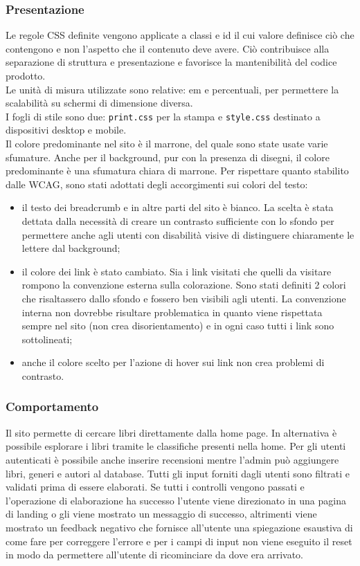\documentclass[12pt,a4paper,headings=optiontohead]{article}
\begin{document}
	\subsubsection{Presentazione}
	Le regole CSS definite vengono applicate a classi e id il cui valore definisce ciò che contengono e non l'aspetto che il contenuto deve avere. Ciò contribuisce alla separazione di struttura e presentazione e favorisce la mantenibilità del codice prodotto.\\
	Le unità di misura utilizzate sono relative: em e percentuali, per permettere la scalabilità su schermi di dimensione diversa. \\
	I fogli di stile sono due: \texttt{print.css} per la stampa e \texttt{style.css} destinato a dispositivi desktop e mobile. \\
	Il colore predominante nel sito è il marrone, del quale sono state usate varie sfumature. Anche per il background, pur con la presenza di disegni, il colore predominante è una sfumatura chiara di marrone. Per rispettare quanto stabilito dalle WCAG, sono stati adottati degli accorgimenti sui colori del testo:
	\begin{itemize}
		\item il testo dei breadcrumb e in altre parti del sito è bianco. La scelta è stata dettata dalla necessità di creare un contrasto sufficiente con lo sfondo per permettere anche agli utenti con disabilità visive di distinguere chiaramente le lettere dal background;
		\item il colore dei link è stato cambiato. Sia i link visitati che quelli da visitare rompono la convenzione esterna sulla colorazione. Sono stati definiti 2 colori che risaltassero dallo sfondo e fossero ben visibili agli utenti. La convenzione interna non dovrebbe risultare problematica in quanto viene rispettata sempre nel sito (non crea disorientamento) e in ogni caso tutti i link sono sottolineati;
		\item anche il colore scelto per l'azione di hover sui link non crea problemi di contrasto.
	\end{itemize} 
	
	\subsubsection{Comportamento}
	Il sito permette di cercare libri direttamente dalla home page. In alternativa è possibile esplorare i libri tramite le classifiche presenti nella home. Per gli utenti autenticati è possibile anche inserire recensioni mentre l'admin può aggiungere libri, generi e autori al database. Tutti gli input forniti dagli utenti sono filtrati e validati prima di essere elaborati. Se tutti i controlli vengono passati e l'operazione di elaborazione ha successo l'utente viene direzionato in una pagina di landing o gli viene mostrato un messaggio di successo, altrimenti viene mostrato un feedback negativo che fornisce all'utente una spiegazione esaustiva di come fare per correggere l'errore e per i campi di input non viene eseguito il reset in modo da permettere all'utente di ricominciare da dove era arrivato.
	
\end{document}
